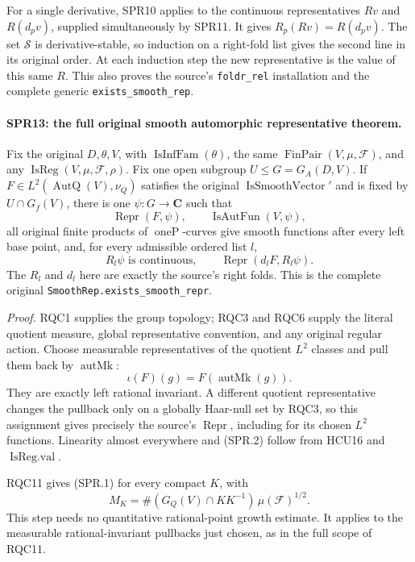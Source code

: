 For a single derivative, SPR10 applies to the continuous
representatives \(Rv\) and \(R(d_pv)\), supplied simultaneously
by SPR11.  It gives \(R_p(Rv)=R(d_pv)\).
The set \(\mathcal S\) is derivative-stable, so induction on a
right-fold list gives the second line in its original order.
At each induction step the new representative is the value of
this same \(R\).  This also proves the source's
\texttt{foldr\_\allowbreak rel} installation and the complete generic
\texttt{exists\_\allowbreak smooth\_\allowbreak rep}.

\paragraph{SPR13: the full original smooth automorphic representative theorem.}
\label{claim:SPR13}
Fix the original \(D,\theta,V\), with \(\operatorname{IsInfFam}(\theta)\),
the same \(\operatorname{FinPair}(V,\mu,\mathcal F)\), and any
\(\operatorname{IsReg}(V,\mu,\mathcal F,\rho)\).
Fix one open subgroup \(U\le G=G_A(D,V)\).
If \(F\in L^2(\operatorname{AutQ}(V),\nu_Q)\) satisfies the original
\(\operatorname{IsSmoothVector}'\) and is fixed by
\(U\cap G_f(V)\), there is one \(\psi:G\to\mathbf C\) such that
\[
 \operatorname{Repr}(F,\psi),\qquad
                  \operatorname{IsAutFun}(V,\psi),
 \tag{SPR.24}
\]
all original finite products of \(\operatorname{oneP}\)-curves give
smooth functions after every left base point, and, for every
admissible ordered list \(l\),
\[
       R_l\psi\text{ is continuous},\qquad
                    \operatorname{Repr}(d_lF,R_l\psi).
 \tag{SPR.25}
\]
The \(R_l\) and \(d_l\) here are exactly the source's right folds.
This is the complete original
\texttt{SmoothRep.\allowbreak exists\_\allowbreak smooth\_\allowbreak repr}.

\emph{Proof.}
RQC1 supplies the group topology; RQC3 and RQC6 supply the literal
quotient measure, global representative convention, and any original
regular action.  Choose measurable representatives of the quotient
\(L^2\) classes and pull them back by \(\operatorname{autMk}\):
\[
                   \iota(F)(g)=F(\operatorname{autMk}(g)).
\]
They are exactly left rational invariant.  A different quotient
representative changes the pullback only on a globally Haar-null
set by RQC3, so this assignment gives precisely the source's
\(\operatorname{Repr}\), including for its chosen \(L^2\) functions.
Linearity almost everywhere and (SPR.2) follow from HCU16 and
\(\operatorname{IsReg.val}\).

RQC11 gives (SPR.1) for every compact \(K\), with
\[
       M_K=\#(G_Q(V)\cap KK^{-1})\,\mu(\mathcal F)^{1/2}.
 \tag{SPR.26}
\]
This step needs no quantitative rational-point growth estimate.
It applies to the measurable rational-invariant pullbacks just
chosen, as in the full scope of RQC11.

